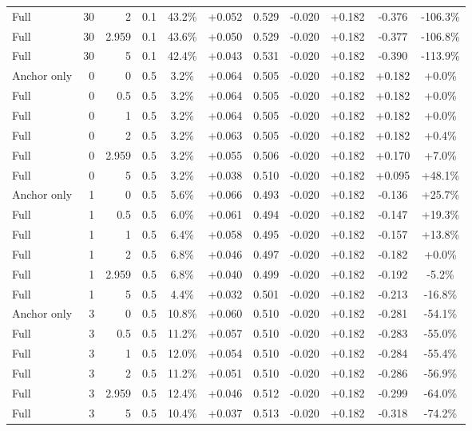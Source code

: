 \begin{table}[htbp]
\begin{tabular}{lrrrccccccc}
Full & 30 & 2 & 0.1 & 43.2\% & +0.052 & 0.529 & -0.020 & +0.182 & -0.376 & -106.3\% \\
Full & 30 & 2.959 & 0.1 & 43.6\% & +0.050 & 0.529 & -0.020 & +0.182 & -0.377 & -106.8\% \\
Full & 30 & 5 & 0.1 & 42.4\% & +0.043 & 0.531 & -0.020 & +0.182 & -0.390 & -113.9\% \\
Anchor only & 0 & 0 & 0.5 & 3.2\% & +0.064 & 0.505 & -0.020 & +0.182 & +0.182 & +0.0\% \\
Full & 0 & 0.5 & 0.5 & 3.2\% & +0.064 & 0.505 & -0.020 & +0.182 & +0.182 & +0.0\% \\
Full & 0 & 1 & 0.5 & 3.2\% & +0.064 & 0.505 & -0.020 & +0.182 & +0.182 & +0.0\% \\
Full & 0 & 2 & 0.5 & 3.2\% & +0.063 & 0.505 & -0.020 & +0.182 & +0.182 & +0.4\% \\
Full & 0 & 2.959 & 0.5 & 3.2\% & +0.055 & 0.506 & -0.020 & +0.182 & +0.170 & +7.0\% \\
Full & 0 & 5 & 0.5 & 3.2\% & +0.038 & 0.510 & -0.020 & +0.182 & +0.095 & +48.1\% \\
Anchor only & 1 & 0 & 0.5 & 5.6\% & +0.066 & 0.493 & -0.020 & +0.182 & -0.136 & +25.7\% \\
Full & 1 & 0.5 & 0.5 & 6.0\% & +0.061 & 0.494 & -0.020 & +0.182 & -0.147 & +19.3\% \\
Full & 1 & 1 & 0.5 & 6.4\% & +0.058 & 0.495 & -0.020 & +0.182 & -0.157 & +13.8\% \\
Full & 1 & 2 & 0.5 & 6.8\% & +0.046 & 0.497 & -0.020 & +0.182 & -0.182 & +0.0\% \\
Full & 1 & 2.959 & 0.5 & 6.8\% & +0.040 & 0.499 & -0.020 & +0.182 & -0.192 & -5.2\% \\
Full & 1 & 5 & 0.5 & 4.4\% & +0.032 & 0.501 & -0.020 & +0.182 & -0.213 & -16.8\% \\
Anchor only & 3 & 0 & 0.5 & 10.8\% & +0.060 & 0.510 & -0.020 & +0.182 & -0.281 & -54.1\% \\
Full & 3 & 0.5 & 0.5 & 11.2\% & +0.057 & 0.510 & -0.020 & +0.182 & -0.283 & -55.0\% \\
Full & 3 & 1 & 0.5 & 12.0\% & +0.054 & 0.510 & -0.020 & +0.182 & -0.284 & -55.4\% \\
Full & 3 & 2 & 0.5 & 11.2\% & +0.051 & 0.510 & -0.020 & +0.182 & -0.286 & -56.9\% \\
Full & 3 & 2.959 & 0.5 & 12.4\% & +0.046 & 0.512 & -0.020 & +0.182 & -0.299 & -64.0\% \\
Full & 3 & 5 & 0.5 & 10.4\% & +0.037 & 0.513 & -0.020 & +0.182 & -0.318 & -74.2\% \\

\end{tabular}
\end{table}
